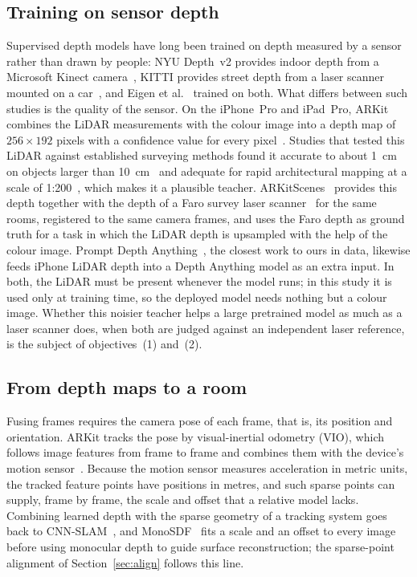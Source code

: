 \subsection{Training on sensor depth}
Supervised depth models have long been trained on depth measured by a sensor rather than drawn by people: NYU
Depth~v2 provides indoor depth from a Microsoft Kinect camera~\cite{nyuv2}, KITTI provides street depth from a laser
scanner mounted on a car~\cite{kitti}, and Eigen et al.~\cite{eigen14} trained on both. What differs between such
studies is the quality of the sensor. On the iPhone~Pro and iPad~Pro, ARKit combines the LiDAR measurements with the
colour image into a depth map of $256\times192$ pixels with a confidence value for every pixel~\cite{arkitscenes}.
Studies that tested this LiDAR against established surveying methods found it accurate to about \SI{1}{cm} on objects
larger than \SI{10}{cm}~\cite{luetzenburg} and adequate for rapid architectural mapping at a scale of
1:200~\cite{spreafico}, which makes it a plausible teacher. ARKitScenes~\cite{arkitscenes} provides this depth together
with the depth of a Faro survey laser scanner~\cite{faro} for the same rooms, registered to the same camera frames, and
uses the Faro depth as ground truth for a task in which the LiDAR depth is upsampled with the help of the colour image.
Prompt Depth Anything~\cite{promptda}, the closest work to ours in data, likewise feeds iPhone LiDAR depth into a Depth
Anything model as an extra input. In both, the LiDAR must be present whenever the model runs; in this study it is used
only at training time, so the deployed model needs nothing but a colour image. Whether this noisier teacher helps a
large pretrained model as much as a laser scanner does, when both are judged against an independent laser reference,
is the subject of objectives~(1) and~(2).

\subsection{From depth maps to a room}
Fusing frames requires the camera pose of each frame, that is, its position and orientation. ARKit tracks the pose by
visual-inertial odometry (VIO), which follows image features from frame to frame and combines them with the device's
motion sensor~\cite{vinsmono}. Because the motion sensor measures acceleration in metric units, the tracked feature
points have positions in metres, and such sparse points can supply, frame by frame, the scale and offset that a
relative model lacks. Combining learned depth with the sparse geometry of a tracking system goes back to
CNN-SLAM~\cite{cnnslam}, and MonoSDF~\cite{monosdf} fits a scale and an offset to every image before using monocular
depth to guide surface reconstruction; the sparse-point alignment of Section~\ref{sec:align} follows this line.

